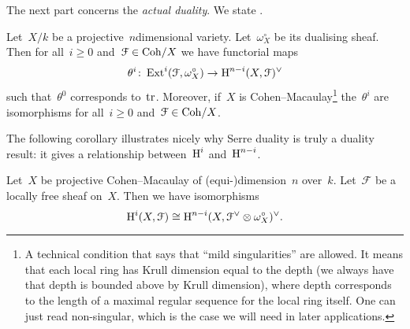 \documentclass[10pt,a4paper]{article}
\begin{document}
The next part concerns the \emph{actual duality}. We state \cite[proposition III.7.6]{hartshorne-algebraic-geometry}.
\begin{theorem}
  \label{theorem:serre-duality}
  Let~$X/k$ be a projective~$n$\dash dimensional variety. Let~$\omega_X^\circ$ be its dualising sheaf. Then for all~$i\geq 0$ and~$\mathcal{F}\in\mathrm{Coh}/X$ we have functorial maps
  \begin{equation}
    \theta^i\colon\operatorname{Ext}^i(\mathcal{F},\omega_X^\circ)\to\operatorname{H}^{n-i}(X,\mathcal{F})^\vee
  \end{equation}
  such that~$\theta^0$ corresponds to~$\operatorname{tr}$. Moreover, if~$X$ is Cohen--Macaulay\footnote{A technical condition that says that ``mild singularities'' are allowed. It means that each local ring has Krull dimension equal to the depth (we always have that depth is bounded above by Krull dimension), where depth corresponds to the length of a maximal regular sequence for the local ring itself. One can just read non-singular, which is the case we will need in later applications.} the~$\theta^i$ are isomorphisms for all~$i\geq 0$ and~$\mathcal{F}\in\mathrm{Coh}/X$.
\end{theorem}
The following corollary illustrates nicely why Serre duality is truly a duality result: it gives a relationship between~$\operatorname{H}^i$ and~$\operatorname{H}^{n-i}$.
\begin{corollary}
  Let~$X$ be projective Cohen--Macaulay of (equi-)dimension~$n$ over~$k$. Let~$\mathcal{F}$ be a locally free sheaf on~$X$. Then we have isomorphisms
  \begin{equation}
    \operatorname{H}^i(X,\mathcal{F})\cong\operatorname{H}^{n-i}(X,\mathcal{F}^\vee\otimes\omega_X^\circ)^\vee.
  \end{equation}
\end{corollary}
\end{document}
